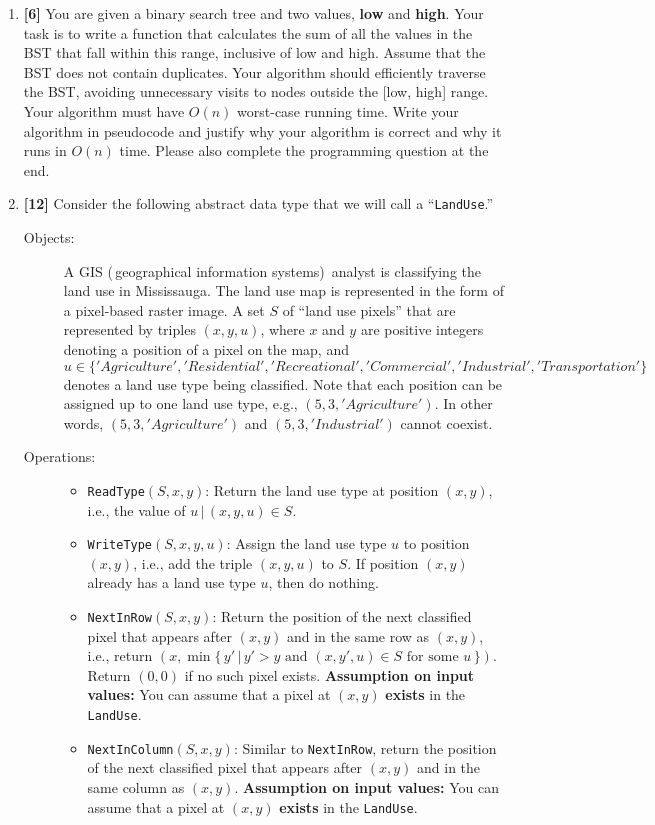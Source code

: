 \documentclass{assignment-263}
\begin{document}
\think
\begin{enumerate}
\item \textbf{[6]}
    You are given a binary search tree and two values, \textbf{low} and \textbf{high}. Your task 
    is to write a function that calculates the sum of all the values in the BST that fall within this
    range, inclusive of low and high. Assume that the BST does not contain duplicates. Your 
    algorithm should efficiently traverse the BST, avoiding unnecessary visits to nodes outside
    the [low, high] range. 
    Your algorithm must have $O(n)$ worst-case running time.
    Write your algorithm in pseudocode and justify why your algorithm is correct and why it runs 
    in $O(n)$ time. Please also complete the programming question at the end. 

\item \textbf{[12]}
    Consider the following abstract data type that we will call a
		``\texttt{LandUse}.''
		\begin{description}
		\item[Objects:]
				A GIS (\,geographical information systems)\, analyst is 
				classifying the land use in Mississauga.
				The land use map is represented in the form of a  
				pixel-based raster image. 
				A set $S$ of ``land use pixels'' that are represented by
				triples $(x, y, u)$, where $x$ and $y$ are positive
				integers denoting a position of a pixel on the map, and
				$u\in\{'Agriculture', 'Residential', 'Recreational',
				'Commercial', 'Industrial', 'Transportation'\}$ denotes 
				a land use type being classified. Note that each position
				can be assigned up to one land use type, e.g., 
				$(5, 3, 'Agriculture')$. In other words, $(5, 3, 'Agriculture')$ 
				and $(5, 3, 'Industrial')$ cannot coexist. 

		\item[Operations:]\mbox{}
			\begin{itemize}
			\item	\texttt{ReadType}$(S, x, y)$: Return the land use type
					at position $(x, y)$, i.e., the value of
					$u \, \vert \, (x, y, u)\in S$. 
			\item	\texttt{WriteType}$(S, x, y, u)$: Assign the land use type
					$u$ to position $(x, y)$, i.e., add the
					triple $(x, y, u)$ to $S$. If position $(x, y)$
					already has a land use type $u$, then do nothing.
			\item	\texttt{NextInRow}$(S, x, y)$: Return the position of the
				next classified pixel that appears after $(x, y)$ and in the
				same row as $(x, y)$, i.e., return $(x, \min\{\,y' \, \vert \, y' > y
				\text{ and } (x, y', u)\in S \text{ for some } u\,\})$.
				Return $(0, 0)$ if no such pixel exists.
				\textbf{Assumption on input values:} You can assume that a
				pixel at $(x, y)$ \textbf{exists} in the \texttt{LandUse}.
			\item	\texttt{NextInColumn}$(S, x, y)$: Similar to
				\texttt{NextInRow}, return the position of the next classified
				pixel that appears after $(x, y)$ and in the same column as
				$(x, y)$.  \textbf{Assumption on input values:} You can
				assume that a pixel at $(x, y)$ \textbf{exists} in the
				\texttt{LandUse}.
 

\end{itemize}
\end{description}
\end{enumerate}
\end{document}
